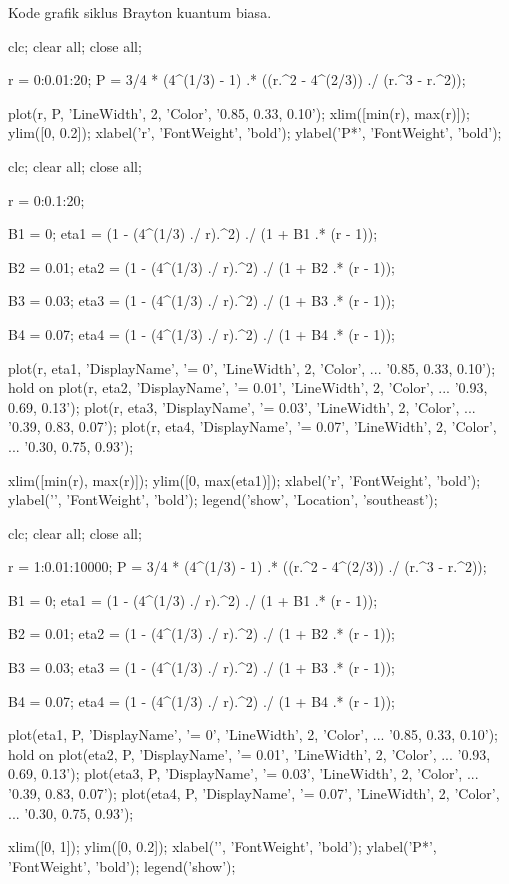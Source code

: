 Kode grafik siklus Brayton kuantum biasa.
\begin{verbatim*}
clc; clear all; close all;

r = 0:0.01:20;
P = 3/4 * (4^(1/3) - 1) .* ((r.^2 - 4^(2/3)) ./ (r.^3 - r.^2));

plot(r, P, 'LineWidth', 2, 'Color', '0.85, 0.33, 0.10');
xlim([min(r), max(r)]);
ylim([0, 0.2]);
xlabel('r', 'FontWeight', 'bold');
ylabel('P*', 'FontWeight', 'bold');

clc; clear all; close all;

r = 0:0.1:20;

B1 = 0;
eta1 = (1 - (4^(1/3) ./ r).^2) ./ (1 + B1 .* (r - 1));

B2 = 0.01;
eta2 = (1 - (4^(1/3) ./ r).^2) ./ (1 + B2 .* (r - 1));

B3 = 0.03;
eta3 = (1 - (4^(1/3) ./ r).^2) ./ (1 + B3 .* (r - 1));

B4 = 0.07;
eta4 = (1 - (4^(1/3) ./ r).^2) ./ (1 + B4 .* (r - 1));

plot(r, eta1, 'DisplayName', '\beta = 0', 'LineWidth', 2, 'Color', ...
    '0.85, 0.33, 0.10');
hold on
plot(r, eta2, 'DisplayName', '\beta = 0.01', 'LineWidth', 2, 'Color', ...
    '0.93, 0.69, 0.13');
plot(r, eta3, 'DisplayName', '\beta = 0.03', 'LineWidth', 2, 'Color', ...
    '0.39, 0.83, 0.07');
plot(r, eta4, 'DisplayName', '\beta = 0.07', 'LineWidth', 2, 'Color', ...
    '0.30, 0.75, 0.93');

xlim([min(r), max(r)]);
ylim([0, max(eta1)]);
xlabel('r', 'FontWeight', 'bold');
ylabel('\eta', 'FontWeight', 'bold');
legend('show', 'Location', 'southeast');

clc; clear all; close all;

r = 1:0.01:10000;
P = 3/4 * (4^(1/3) - 1) .* ((r.^2 - 4^(2/3)) ./ (r.^3 - r.^2));

B1 = 0;
eta1 = (1 - (4^(1/3) ./ r).^2) ./ (1 + B1 .* (r - 1));

B2 = 0.01;
eta2 = (1 - (4^(1/3) ./ r).^2) ./ (1 + B2 .* (r - 1));

B3 = 0.03;
eta3 = (1 - (4^(1/3) ./ r).^2) ./ (1 + B3 .* (r - 1));

B4 = 0.07;
eta4 = (1 - (4^(1/3) ./ r).^2) ./ (1 + B4 .* (r - 1));

plot(eta1, P, 'DisplayName', '\beta = 0', 'LineWidth', 2, 'Color', ...
    '0.85, 0.33, 0.10');
hold on
plot(eta2, P, 'DisplayName', '\beta = 0.01', 'LineWidth', 2, 'Color', ...
    '0.93, 0.69, 0.13');
plot(eta3, P, 'DisplayName', '\beta = 0.03', 'LineWidth', 2, 'Color', ...
    '0.39, 0.83, 0.07');
plot(eta4, P, 'DisplayName', '\beta = 0.07', 'LineWidth', 2, 'Color', ...
    '0.30, 0.75, 0.93');

xlim([0, 1]);
ylim([0, 0.2]);
xlabel('\eta', 'FontWeight', 'bold');
ylabel('P*', 'FontWeight', 'bold');
legend('show');
\end{verbatim*}

